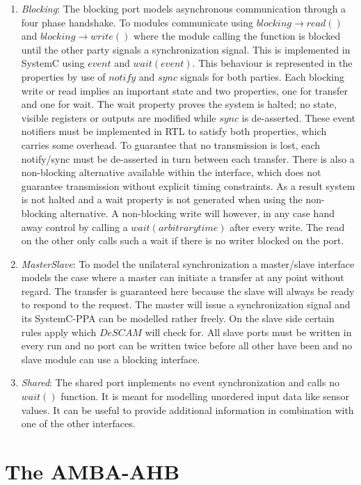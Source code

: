 \begin{enumerate}
 \item \textit{Blocking}: The blocking port models asynchronous communication through a four phase handshake. To modules communicate using $blocking\rightarrow read()$ and $blocking\rightarrow write()$ where the module calling the function is blocked until the other party signals a synchronization signal. This is implemented in SystemC using $event$ and $wait(event)$. This behaviour is represented in the properties by use of $notify$ and $sync$ signals for both parties. Each blocking write or read implies an important state and two properties, one for transfer and one for wait. The wait property proves the system is halted; no state, visible registers or outputs are modified while $sync$ is de-asserted. These event notifiers must be implemented in RTL to satisfy both properties, which carries some overhead. To guarantee that no transmission is lost, each notify/sync must be de-asserted in turn between each transfer. There is also a non-blocking alternative available within the interface, which does not guarantee transmission without explicit timing constraints. As a result system is not halted and a wait property is not generated when using the non-blocking alternative. A non-blocking write will however, in any case hand away control by calling a $wait(arbitrary time)$ after every write. The read on the other only calls such a wait if there is no writer blocked on the port.  
 \item \textit{MasterSlave}: To model the unilateral synchronization a master/slave interface models the case where a master can initiate a transfer at any point without regard. The transfer is guaranteed here because the slave will always be ready to respond to the request. The master will issue a synchronization signal and its SystemC-PPA can be modelled rather freely. On the slave side certain rules apply which $DeSCAM$ will check for. All slave ports must be written in every run and no port can be written twice before all other have been and no slave module can use a blocking interface.
 \item \textit{Shared}: The shared port implements no event synchronization and calls no $wait()$ function. It is meant for modelling unordered input data like sensor values. It can be useful to provide additional information in combination with one of the other interfaces.   
\end{enumerate} 


\section{The AMBA-AHB}
\label{sec:ahb}


